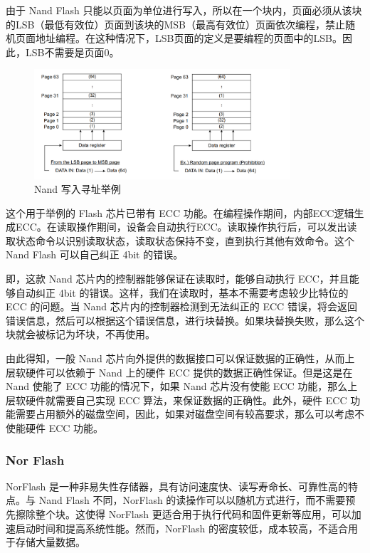 由于 Nand Flash 只能以页面为单位进行写入，所以在一个块内，页面必须从该块的LSB（最低有效位）页面到该块的MSB（最高有效位）页面依次编程，禁止随机页面地址编程。在这种情况下，LSB页面的定义是要编程的页面中的LSB。因此，LSB不需要是页面0。

\begin{figure}[htbp]
  \centering
  \includegraphics[width=0.85\textwidth]{fig/nand-write-addr}
  \caption{Nand 写入寻址举例}
  \label{nand-write-addr}
\end{figure}

这个用于举例的 Flash 芯片已带有 ECC 功能。在编程操作期间，内部ECC逻辑生成ECC。在读取操作期间，设备会自动执行ECC。读取操作执行后，可以发出读取状态命令以识别读取状态，读取状态保持不变，直到执行其他有效命令。这个 Nand Flash 可以自己纠正 4bit 的错误。

即，这款 Nand 芯片内的控制器能够保证在读取时，能够自动执行 ECC，并且能够自动纠正 4bit 的错误。这样，我们在读取时，基本不需要考虑较少比特位的 ECC 的问题。当 Nand 芯片内的控制器检测到无法纠正的 ECC 错误，将会返回错误信息，然后可以根据这个错误信息，进行块替换。如果块替换失败，那么这个块就会被标记为坏块，不再使用。

由此得知，一般 Nand 芯片向外提供的数据接口可以保证数据的正确性，从而上层软硬件可以依赖于 Nand 上的硬件 ECC 提供的数据正确性保证。但是这是在 Nand 使能了 ECC 功能的情况下，如果 Nand 芯片没有使能 ECC 功能，那么上层软硬件就需要自己实现 ECC 算法，来保证数据的正确性。此外，硬件 ECC 功能需要占用额外的磁盘空间，因此，如果对磁盘空间有较高要求，那么可以考虑不使能硬件 ECC 功能。

\subsubsection{Nor Flash}

NorFlash 是一种非易失性存储器，具有访问速度快、读写寿命长、可靠性高的特点。与 Nand Flash 不同，NorFlash 的读操作可以以随机方式进行，而不需要预先擦除整个块。这使得 NorFlash 更适合用于执行代码和固件更新等应用，可以加速启动时间和提高系统性能。然而，NorFlash 的密度较低，成本较高，不适合用于存储大量数据。

